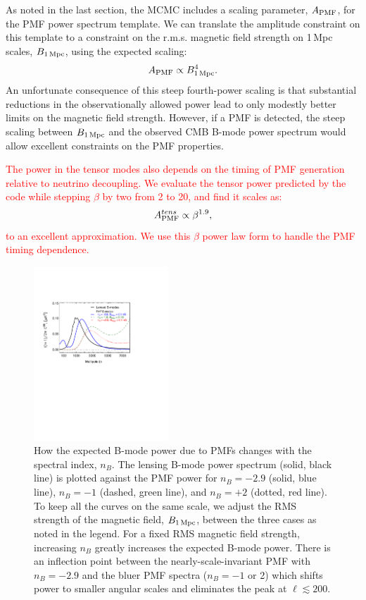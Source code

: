 \documentclass[apj]{emulateapj}
\newcommand{\apmf}{\ensuremath{A_{\rm PMF}}}
\newcommand{\bpmf}{\ensuremath{B_{\rm 1\,Mpc}}}
\newcommand{\be}{\begin{equation}}
\newcommand{\ee}{\end{equation}}
\newcommand{\changed}[1]{\textcolor{Red}{#1}}
\begin{document}
As noted in the last section, the MCMC includes a  scaling parameter, \apmf{}, for the PMF power spectrum template. 
We can translate the amplitude constraint on this template to a constraint on the r.m.s. magnetic field strength on 1\,Mpc scales, \bpmf, using the expected scaling:
\be \label{eqn:scaling}
\apmf \propto \bpmf^4.
\ee
An unfortunate consequence of this steep fourth-power scaling is that substantial reductions in the observationally allowed power lead to only modestly better limits on the magnetic field strength. 
However, if a PMF is detected, the steep scaling between \bpmf{} and the observed CMB B-mode power spectrum would allow excellent constraints on the PMF properties.

\changed{The power in the tensor modes also depends on the timing of PMF generation relative to neutrino decoupling. 
We evaluate the tensor power predicted by the \citet{zucca16} code while stepping $\beta$ by two from 2 to 20, and find it scales as:
\be \label{eqn:betascaling}
\apmf^{tens} \propto \beta^{1.9},
\ee
to an excellent approximation. 
We use this $\beta$ power law form to handle the PMF timing dependence. }

\begin{figure}[htb]\centering
\includegraphics[width=0.45\textwidth,clip,trim={1.5cm 12.cm 5.5cm 4cm}]{pmf_templates_nb.pdf}
  \caption[CMB polarization from PMFs with different spectral indices]{ \label{fig:pmf-nb}
  How the expected B-mode power due to PMFs changes with the spectral index, $n_B$. 
  The lensing B-mode power spectrum (solid, black line) is plotted against the PMF power for $n_B=-2.9$ (solid, blue line), $n_B=-1$ (dashed, green line), and $n_B=+2$ (dotted, red line). 
  To keep all the curves on the same scale, we adjust the RMS strength of the magnetic field, \bpmf{}, between the three cases as noted in the legend. 
  For a fixed RMS magnetic field strength, increasing $n_B$ greatly increases the expected B-mode power. 
  There is an inflection point between the nearly-scale-invariant PMF with $n_B=-2.9$ and the bluer PMF spectra ($n_B=-1$ or 2) which shifts power to smaller angular scales and eliminates the peak at $\ell \lesssim 200$. 
  }
\end{figure}
 
\end{document}
